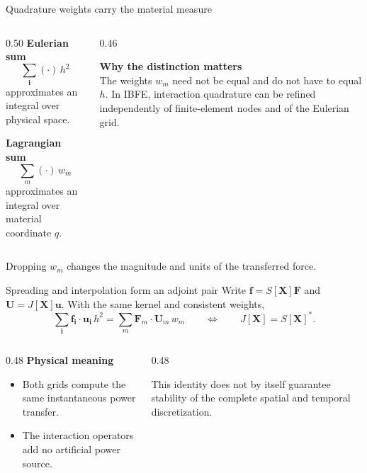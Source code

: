 \documentclass[aspectratio=169,11pt]{beamer}
\newcommand{\uvec}{\bm{u}}
\newcommand{\Xvec}{\bm{X}}
\newcommand{\Uvec}{\bm{U}}
\newcommand{\fvec}{\bm{f}}
\newcommand{\Fvec}{\bm{F}}
\newcommand{\ivec}{\bm{i}}
\begin{document}
\begin{frame}{Quadrature weights carry the material measure}
\begin{columns}[T,onlytextwidth]
\begin{column}{0.50\textwidth}
\textbf{Eulerian sum}
\[
  \sum_{\ivec}(\cdot)\,h^2
\]
approximates an integral over physical space.
\medskip

\textbf{Lagrangian sum}
\[
  \sum_m(\cdot)\,w_m
\]
approximates an integral over material coordinate \(q\).
\end{column}
\begin{column}{0.46\textwidth}
\begin{punchbox}
\textbf{Why the distinction matters}\\[3pt]
The weights \(w_m\) need not be equal and do not have to equal \(h\). In IBFE, interaction quadrature can be refined independently of finite-element nodes and of the Eulerian grid.
\end{punchbox}
\end{column}
\end{columns}
\begin{punchbox}
\centering
\small Dropping \(w_m\) changes the magnitude and units of the transferred force.
\end{punchbox}
\end{frame}

\begin{frame}{Spreading and interpolation form an adjoint pair}
Write \(\fvec=S[\Xvec]\Fvec\) and \(\Uvec=J[\Xvec]\uvec\). With the same kernel and consistent weights,
\[
  \boxed{
  \sum_{\ivec}
  \fvec_{\ivec}\cdot\uvec_{\ivec}\,h^2
  =
  \sum_m
  \Fvec_m\cdot\Uvec_m\,w_m
  }
  \qquad\Longleftrightarrow\qquad
  J[\Xvec]=S[\Xvec]^*.
\]
\begin{columns}[T,onlytextwidth]
\begin{column}{0.48\textwidth}
\textbf{Physical meaning}
\begin{itemize}\itemsep5pt
  \item Both grids compute the same instantaneous power transfer.
  \item The interaction operators add no artificial power source.
\end{itemize}
\end{column}
\begin{column}{0.48\textwidth}
\begin{punchbox}
\small This identity does not by itself guarantee stability of the complete spatial and temporal discretization.
\end{punchbox}
\end{column}
\end{columns}
\end{frame}
\end{document}
